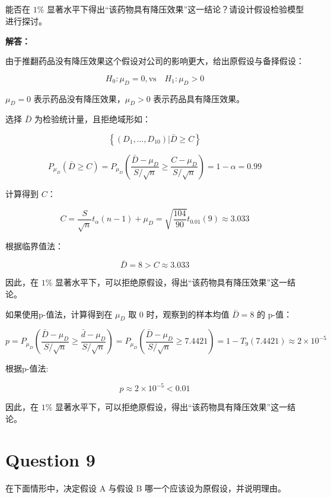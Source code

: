 \documentclass[12pt,a4paper]{article}
\begin{document}
\subsection{}

能否在 $1\%$ 显著水平下得出“该药物具有降压效果”这一结论？请设计假设检验模型进行探讨。

\begin{answerbox}
\textbf{解答：}

由于推翻药品没有降压效果这个假设对公司的影响更大，给出原假设与备择假设：

$$
H_0: \mu_D = 0, \text{vs} \quad H_1: \mu_D > 0
$$

$\mu_D = 0$ 表示药品没有降压效果，$\mu_D > 0$ 表示药品具有降压效果。

选择 $\bar{D}$ 为检验统计量，且拒绝域形如：

$$
\left\{(D_1, \ldots, D_{10}) | \bar{D} \geq C\right\}
$$

$$
P_{\mu_D} \left(\bar{D} \geq C\right) = P_{\mu_D}\left(\frac{\bar{D}-\mu_D}{S/\sqrt{n}} \geq \frac{C-\mu_D}{S/\sqrt{n}}\right) = 1-\alpha = 0.99
$$

计算得到 $C$：

$$
C = \frac{S}{\sqrt{n}}t_\alpha(n-1)+\mu_D = \sqrt{\frac{104}{90}}t_{0.01}(9) \approx 3.033
$$

根据临界值法：

$$
\bar{D} = 8 > C \approx 3.033
$$

因此，在 $1\%$ 显著水平下，可以拒绝原假设，得出“该药物具有降压效果”这一结论。

如果使用p-值法，计算得到在 $\mu_D$ 取 $0$ 时，观察到的样本均值 $\bar{D} = 8$ 的 p-值：

$$
p = P_{\mu_D}\left(\frac{\bar{D}-\mu_D}{S/\sqrt{n}} \geq \frac{\bar{d}-\mu_D}{S/\sqrt{n}}\right) = P_{\mu_D}\left(\frac{\bar{D}-\mu_D}{S/\sqrt{n}} \geq 7.4421\right) = 1-T_9(7.4421) \approx 2 \times 10^{-5}
$$

根据p-值法:

$$
p \approx 2 \times 10^{-5} < 0.01
$$

因此，在 $1\%$ 显著水平下，可以拒绝原假设，得出“该药物具有降压效果”这一结论。

\end{answerbox}

\section{Question 9}

在下面情形中，决定假设 A 与假设 B 哪一个应该设为原假设，并说明理由。
\end{document}
